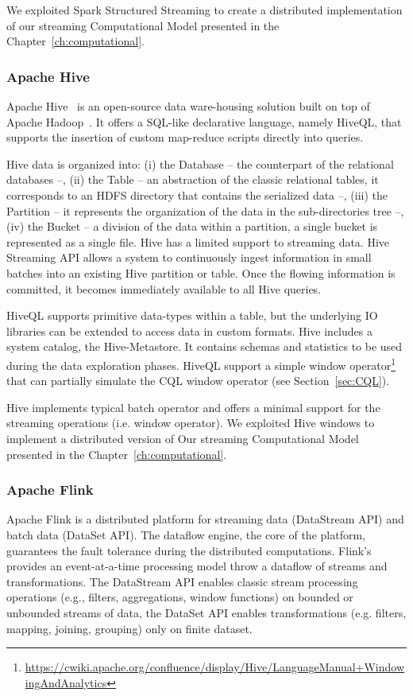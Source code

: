 We exploited Spark Structured Streaming to create a distributed implementation of our streaming Computational Model presented in the Chapter~\ref{ch:computational}.

\subsubsection{Apache Hive} \label{sec:hive}
Apache Hive~\cite{DBLP:journals/pvldb/ThusooSJSCALWM09} is an open-source data ware-housing solution built on top of Apache Hadoop~\cite{dean2008mapreduce}. It offers a SQL-like declarative language, namely HiveQL, that supports the insertion of custom map-reduce scripts directly into queries.

Hive data is organized into: (i) the Database -- the counterpart of the relational databases --, (ii) the Table -- an abstraction of the classic relational tables, it corresponds to an HDFS directory that contains the serialized data --, (iii) the Partition -- it represents the organization of the data in the sub-directories tree --, (iv) the Bucket -- a division of the data within a partition, a single bucket is represented as a single file.
Hive has a limited support to streaming data. Hive Streaming API allows a system to continuously ingest information in small batches into an existing Hive partition or table. Once the flowing information is committed, it becomes immediately available to all Hive queries.

HiveQL supports primitive data-types within a table, but the underlying IO libraries can be extended to access data in custom formats.
Hive includes a system catalog, the Hive-Metastore. It contains schemas and statistics to be used during the data exploration phases.
HiveQL support a simple window operator\footnote{\url{https://cwiki.apache.org/confluence/display/Hive/LanguageManual+WindowingAndAnalytics}} that can partially simulate the CQL window operator (see Section~\ref{sec:CQL}).  

Hive implements typical batch operator and offers a minimal support for the streaming operations (i.e. window operator). We exploited Hive windows to implement a distributed version of Our streaming Computational Model presented in the Chapter~\ref{ch:computational}.

\subsubsection{Apache Flink}
Apache Flink \cite{DBLP:journals/debu/CarboneKEMHT15} is a distributed platform for streaming data (DataStream API) and batch data (DataSet API). The dataflow engine, the core of the platform, guarantees the fault tolerance during the distributed computations.
Flink's provides an event-at-a-time processing model throw a dataflow of streams and transformations. The DataStream API enables classic stream processing operations (e.g., filters, aggregations, window functions) on bounded or unbounded streams of data, the DataSet API enables transformations (e.g. filters, mapping, joining, grouping) only on finite dataset.

